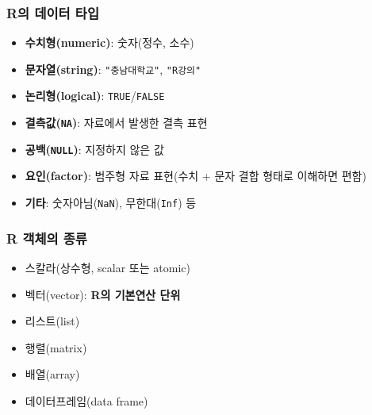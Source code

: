 \documentclass[
  11pt,
]{krantz}
\providecommand{\tightlist}{%
  \setlength{\itemsep}{0pt}\setlength{\parskip}{0pt}}
\begin{document}
\hypertarget{object-value}{%
\subsubsection*{R의 데이터 타입}\label{object-value}}


\begin{itemize}
\item
  \textbf{수치형(numeric)}: 숫자(정수, 소수)
\item
  \textbf{문자열(string)}: \texttt{"충남대학교"}, \texttt{"R강의"}
\item
  \textbf{논리형(logical)}: \texttt{TRUE}/\texttt{FALSE}
\item
  \textbf{결측값(\texttt{NA})}: 자료에서 발생한 결측 표현
\item
  \textbf{공백(\texttt{NULL})}: 지정하지 않은 값
\item
  \textbf{요인(factor)}: 범주형 자료 표현(수치 + 문자 결합 형태로 이해하면 편함)
\item
  \textbf{기타}: 숫자아님(\texttt{NaN}), 무한대(\texttt{Inf}) 등
\end{itemize}

\hypertarget{ch2-object-type}{%
\subsubsection*{R 객체의 종류}\label{ch2-object-type}}


\begin{itemize}
\tightlist
\item
  스칼라(상수형, scalar 또는 atomic)
\item
  벡터(vector): \textbf{R의 기본연산 단위}
\item
  리스트(list)
\item
  행렬(matrix)
\item
  배열(array)
\item
  데이터프레임(data frame)
\end{itemize}

\footnotesize
\end{document}
